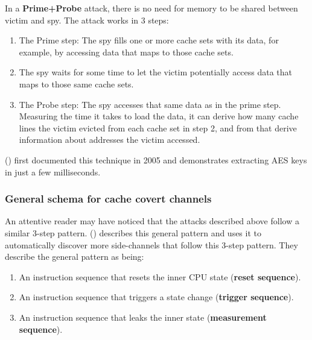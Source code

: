 \documentclass[
  a4paper,
]{report}
\providecommand{\tightlist}{%
  \setlength{\itemsep}{0pt}\setlength{\parskip}{0pt}}
\begin{document}
In a
\textbf{\label{__index_entry_128}{Prime+Probe}}
attack, there is no need for memory to be shared between victim and spy.
The attack works in 3 steps:

\begin{enumerate}
\def\labelenumi{\arabic{enumi}.}
\tightlist
\item
  The Prime step: The spy fills one or more cache sets with its data,
  for example, by accessing data that maps to those cache sets.
\item
  The spy waits for some time to let the victim potentially access data
  that maps to those same cache sets.
\item
  The Probe step: The spy accesses that same data as in the prime step.
  Measuring the time it takes to load the data, it can derive how many
  cache lines the victim evicted from each cache set in step 2, and from
  that derive information about addresses the victim accessed.
\end{enumerate}

() first
documented this technique in 2005 and demonstrates extracting AES keys
in just a few milliseconds.

\subsubsection{General schema for cache covert
channels}\label{general-schema-for-cache-covert-channels}

An attentive reader may have noticed that the attacks described above
follow a similar 3-step pattern. () describes this general pattern and uses it to automatically
discover more side-channels that follow this 3-step pattern. They
describe the general pattern as being:

\begin{enumerate}
\def\labelenumi{\arabic{enumi}.}
\tightlist
\item
  An instruction sequence that resets the inner CPU state
  (\textbf{\label{__index_entry_129}{reset
  sequence}}).
\item
  An instruction sequence that triggers a state change
  (\textbf{\label{__index_entry_130}{trigger
  sequence}}).
\item
  An instruction sequence that leaks the inner state
  (\textbf{\label{__index_entry_131}{measurement
  sequence}}).
\end{enumerate}
\end{document}
